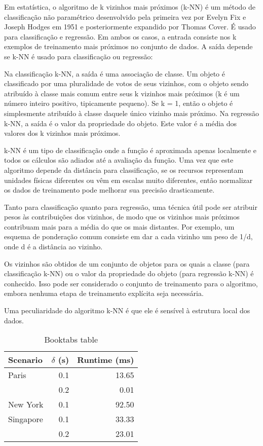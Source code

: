 \documentclass{article}
\begin{document}
Em estatística, o algoritmo de k vizinhos mais próximos (k-NN) é um método de classificação não paramétrico desenvolvido pela primeira vez por Evelyn Fix e Joseph Hodges em 1951 e posteriormente expandido por Thomas Cover. É usado para classificação e regressão. Em ambos os casos, a entrada consiste nos k exemplos de treinamento mais próximos no conjunto de dados. A saída depende se k-NN é usado para classificação ou regressão:

Na classificação k-NN, a saída é uma associação de classe. Um objeto é classificado por uma pluralidade de votos de seus vizinhos, com o objeto sendo atribuído à classe mais comum entre seus k vizinhos mais próximos (k é um número inteiro positivo, tipicamente pequeno). Se k = 1, então o objeto é simplesmente atribuído à classe daquele único vizinho mais próximo. Na regressão k-NN, a saída é o valor da propriedade do objeto. Este valor é a média dos valores dos k vizinhos mais próximos.

k-NN é um tipo de classificação onde a função é aproximada apenas localmente e todos os cálculos são adiados até a avaliação da função. Uma vez que este algoritmo depende da distância para classificação, se os recursos representam unidades físicas diferentes ou vêm em escalas muito diferentes, então normalizar os dados de treinamento pode melhorar sua precisão drasticamente.

Tanto para classificação quanto para regressão, uma técnica útil pode ser atribuir pesos às contribuições dos vizinhos, de modo que os vizinhos mais próximos contribuam mais para a média do que os mais distantes. Por exemplo, um esquema de ponderação comum consiste em dar a cada vizinho um peso de 1/d, onde d é a distância ao vizinho.

Os vizinhos são obtidos de um conjunto de objetos para os quais a classe (para classificação k-NN) ou o valor da propriedade do objeto (para regressão k-NN) é conhecido. Isso pode ser considerado o conjunto de treinamento para o algoritmo, embora nenhuma etapa de treinamento explícita seja necessária.

Uma peculiaridade do algoritmo k-NN é que ele é sensível à estrutura local dos dados.

\begin{table}[h]
\centering
\begin{tabular}{lrr}
\toprule
Scenario  & $\delta$ (s) & Runtime (ms) \\
\midrule
Paris       & 0.1  & 13.65      \\
            & 0.2  & 0.01       \\
New York    & 0.1  & 92.50      \\
Singapore   & 0.1  & 33.33      \\
            & 0.2  & 23.01      \\
\bottomrule
\end{tabular}
\caption{Booktabs table}
\label{tab:booktabs}
\end{table}
\end{document}

